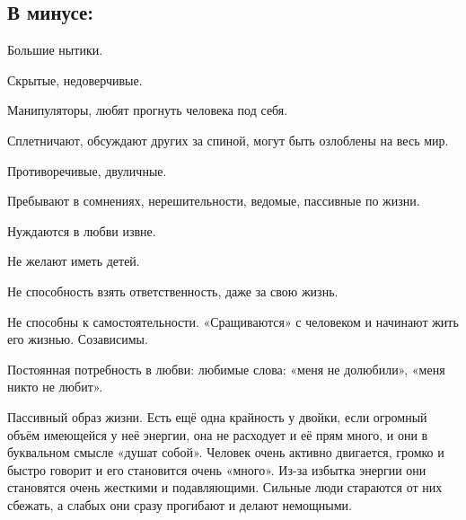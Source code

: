 \subsection{В минусе:}
\item Большие нытики.                                                                                    
\item Скрытые, недоверчивые.                                                                            
\item Манипуляторы, любят прогнуть человека под себя.                                                   
\item Сплетничают, обсуждают других за спиной, могут быть озлоблены на весь мир.                         
\item Противоречивые, двуличные.                                                                        
\item Пребывают в сомнениях, нерешительности, ведомые, пассивные по жизни.                              
\item Нуждаются в любви извне.                                                                          
\item Не желают иметь детей.                                                                            
\item Не способность взять ответственность, даже за свою жизнь.                                         
\item Не способны к самостоятельности. «Сращиваются» с человеком и начинают жить его жизнью. Созависимы. 
\item Постоянная потребность в любви: любимые слова: «меня не долюбили», «меня никто не любит».          
\item Пассивный образ жизни.                                                                           
Есть ещё одна крайность у двойки, если огромный объём имеющейся у неё энергии, 
она не расходует и её прям много, и они в буквальном смысле «душат собой».
Человек очень активно двигается, громко и быстро говорит и его становится очень «много».
Из-за избытка энергии они становятся очень жесткими и подавляющими. Сильные люди стараются от них сбежать,
а слабых они сразу прогибают и делают немощными.
\endsubsection


